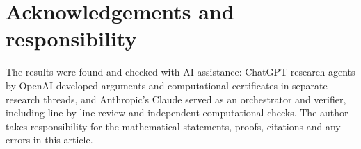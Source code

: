 \documentclass[11pt]{amsart}
\theoremstyle{definition}
\begin{document}
\section*{Acknowledgements and responsibility}
The results were found and checked with AI assistance: ChatGPT research agents by OpenAI developed arguments and computational certificates in separate research threads, and Anthropic's Claude served as an orchestrator and verifier, including line-by-line review and independent computational checks. The author takes responsibility for the mathematical statements, proofs, citations and any errors in this article.



\end{document}
